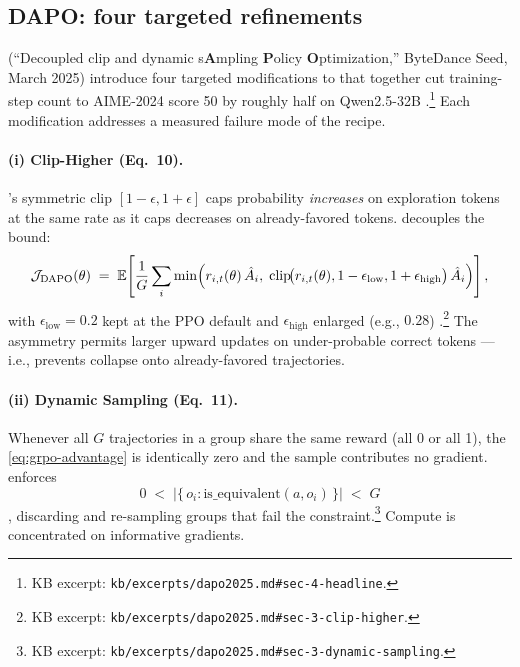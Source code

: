 \subsection{DAPO: four targeted refinements}
\label{sec:rlvr-dapo}

\citet{dapo2025} (``Decoupled clip and dynamic s\textbf{A}mpling
\textbf{P}olicy \textbf{O}ptimization,'' ByteDance Seed, March 2025)
introduce four targeted modifications to  that together cut
training-step count to AIME-2024 score 50 by roughly half on
Qwen2.5-32B \citep[\S 4]{dapo2025}.\footnote{KB excerpt:
\nolinkurl{kb/excerpts/dapo2025.md#sec-4-headline}.} Each modification
addresses a measured failure mode of the  recipe.

\paragraph{(i) Clip-Higher (Eq.\ 10).} 's symmetric clip
$[1 - \epsilon, 1 + \epsilon]$ caps probability \emph{increases} on
exploration tokens at the same rate as it caps decreases on
already-favored tokens.  decouples the bound:
\begin{equation}
\mathcal{J}_{\mathrm{DAPO}}(\theta) \;=\; \operatorname{\mathbb{E}}\!\left[\frac{1}{G} \sum_i \min\!\Big( r_{i,t}(\theta)\, \hat{A}_i,\; \mathrm{clip}\!\big(r_{i,t}(\theta), 1 - \epsilon_{\mathrm{low}}, 1 + \epsilon_{\mathrm{high}}\big)\, \hat{A}_i \Big) \right],
\label{eq:dapo-clip}
\end{equation}
with $\epsilon_{\mathrm{low}} = 0.2$ kept at the PPO default and
$\epsilon_{\mathrm{high}}$ enlarged (e.g., $0.28$)
\citep[Eq.\ 10]{dapo2025}.\footnote{KB excerpt:
\nolinkurl{kb/excerpts/dapo2025.md#sec-3-clip-higher}.} The asymmetry
permits larger upward updates on under-probable correct tokens — i.e.,
prevents collapse onto already-favored trajectories.

\paragraph{(ii) Dynamic Sampling (Eq.\ 11).} Whenever all $G$
trajectories in a group share the same reward (all 0 or all 1), the
 \cref{eq:grpo-advantage} is identically zero
and the sample contributes no gradient.  enforces
\begin{equation}
0 \;<\; \big| \{\, o_i : \mathrm{is\_equivalent}(a, o_i) \,\}\big| \;<\; G
\label{eq:dapo-dynsample}
\end{equation}
\citep[Eq.\ 11]{dapo2025}, discarding and re-sampling groups that fail
the constraint.\footnote{KB excerpt:
\nolinkurl{kb/excerpts/dapo2025.md#sec-3-dynamic-sampling}.} Compute is
concentrated on informative gradients.

